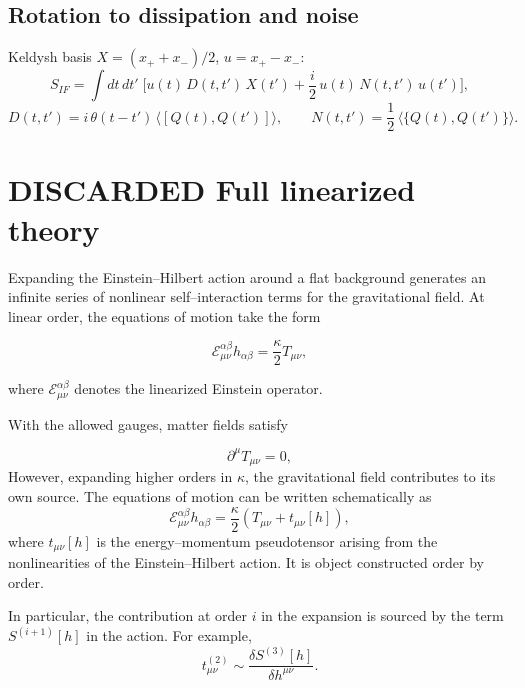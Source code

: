 \documentclass[12pt,a4paper,oneside]{article}
\numberwithin{equation}{section}   %
\begin{document}
\subsection*{Rotation to dissipation and noise}

Keldysh basis $X=(x_++x_-)/2$, $u=x_+-x_-$:
\begin{equation}
S_{IF} = \int dt\,dt'\;\Big[u(t)\,D(t,t')\,X(t') + \frac{i}{2}\,u(t)\,N(t,t')\,u(t')\Big],
\end{equation}
\begin{equation}
D(t,t') = i\,\theta(t-t')\,\big\langle[Q(t),Q(t')]\big\rangle,
\qquad
N(t,t') = \frac12\,\big\langle\{Q(t),Q(t')\}\big\rangle.
\end{equation}

\section{DISCARDED Full linearized theory}

Expanding the Einstein–Hilbert action around a flat background generates an infinite 
series of nonlinear self–interaction terms for the gravitational field. At linear order, 
the equations of motion take the form


\[
\mathcal{E}_{\mu\nu}^{\alpha\beta} h_{\alpha\beta}
= \frac{\kappa}{2} T_{\mu\nu},
\]


where \(\mathcal{E}_{\mu\nu}^{\alpha\beta}\) denotes the linearized Einstein operator.

With the allowed gauges, matter fields satisfy


\[
\partial^\mu T_{\mu\nu} = 0,
\]
However, expanding higher orders in \(\kappa\), the gravitational field contributes to its own source. 
The equations of motion can be written schematically as
\begin{equation}
\mathcal{E}_{\mu\nu}^{\alpha\beta} h_{\alpha\beta}
= \frac{\kappa}{2}\left( T_{\mu\nu} + t_{\mu\nu}[h] \right),
\end{equation}
where \(t_{\mu\nu}[h]\) is the energy–momentum pseudotensor arising from the nonlinearities of the Einstein–Hilbert action. 
It is object constructed order by order.

In particular, the contribution at order \(i\) in the expansion is sourced by the term 
\(S^{(i+1)}[h]\) in the action. For example,
\begin{equation}
t_{\mu\nu}^{(2)} \sim \frac{\delta S^{(3)}[h]}{\delta h^{\mu\nu}}.
\end{equation}
\end{document}

